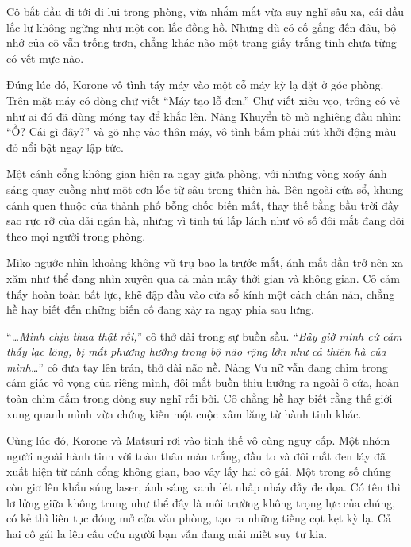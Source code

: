 \documentclass[../main.tex]{subfiles}
\begin{document}
Cô bắt đầu đi tới đi lui trong phòng, vừa nhắm mắt vừa suy nghĩ sâu xa, cái đầu lắc lư không ngừng như một con lắc đồng hồ. Nhưng dù có cố gắng đến đâu, bộ nhớ của cô vẫn trống trơn, chẳng khác nào một trang giấy trắng tinh chưa từng có vết mực nào.

Đúng lúc đó, Korone vô tình táy máy vào một cỗ máy kỳ lạ đặt ở góc phòng. Trên mặt máy có dòng chữ viết ``Máy tạo lỗ đen.'' Chữ viết xiêu vẹo, trông có vẻ như ai đó đã dùng móng tay để khắc lên. Nàng Khuyển tò mò nghiêng đầu nhìn: ``Ồ? Cái gì đây?'' và gõ nhẹ vào thân máy, vô tình bấm phải nút khởi động màu đỏ nổi bật ngay lập tức.

Một cánh cổng không gian hiện ra ngay giữa phòng, với những vòng xoáy ánh sáng quay cuồng như một cơn lốc từ sâu trong thiên hà. Bên ngoài cửa sổ, khung cảnh quen thuộc của thành phố bỗng chốc biến mất, thay thế bằng bầu trời đầy sao rực rỡ của dải ngân hà, những vì tinh tú lấp lánh như vô số đôi mắt đang dõi theo mọi người trong phòng.

\begin{figure}[H]
  \centering
\end{figure}

Miko ngước nhìn khoảng không vũ trụ bao la trước mắt, ánh mắt dần trở nên xa xăm như thể đang nhìn xuyên qua cả màn mây thời gian và không gian. Cô cảm thấy hoàn toàn bất lực, khẽ đập đầu vào cửa sổ kính một cách chán nản, chẳng hề hay biết đến những biến cố đang xảy ra ngay phía sau lưng.

``\textit{\dots Mình chịu thua thật rồi,}'' cô thở dài trong sự buồn sầu. ``\textit{Bây giờ mình cứ cảm thấy lạc lõng, bị mất phương hướng trong bộ não rộng lớn như cả thiên hà của mình\dots}'' cô đưa tay lên trán, thở dài não nề. Nàng Vu nữ vẫn đang chìm trong cảm giác vô vọng của riêng mình, đôi mắt buồn thiu hướng ra ngoài ô cửa, hoàn toàn chìm đắm trong dòng suy nghĩ rối bời. Cô chẳng hề hay biết rằng thế giới xung quanh mình vừa chứng kiến một cuộc xâm lăng từ hành tinh khác.

Cùng lúc đó, Korone và Matsuri rơi vào tình thế vô cùng nguy cấp. Một nhóm người ngoài hành tinh với toàn thân màu trắng, đầu to và đôi mắt đen láy đã xuất hiện từ cánh cổng không gian, bao vây lấy hai cô gái. Một trong số chúng còn giơ lên khẩu súng laser, ánh sáng xanh lét nhấp nháy đầy đe dọa. Có tên thì lơ lửng giữa không trung như thể đây là môi trường không trọng lực của chúng, có kẻ thì liên tục đóng mở cửa văn phòng, tạo ra những tiếng cọt kẹt kỳ lạ. Cả hai cô gái la lên cầu cứu người bạn vẫn đang mải miết suy tư kia.
\end{document}
